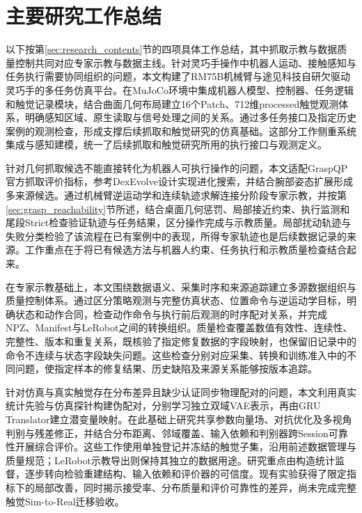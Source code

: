 \section{主要研究工作总结}
\label{sec:ch07_research_work_summary}

以下按第\ref{sec:research_contents}节的四项具体工作总结，其中抓取示教与数据质量控制共同对应专家示教与数据主线。针对灵巧手操作中机器人运动、接触感知与任务执行需要协同组织的问题，本文构建了RM75B机械臂与途见科技自研欠驱动灵巧手的多任务仿真平台。在MuJoCo环境中集成机器人模型、控制器、任务逻辑和触觉记录模块，结合曲面几何布局建立16个Patch、712维processed触觉观测体系，明确感知区域、原生读取与信号处理之间的关系。通过多任务接口及指定历史案例的观测检查，形成支撑后续抓取和触觉研究的仿真基础。这部分工作侧重系统集成与感知建模，统一了后续抓取和触觉研究所用的执行接口与观测定义。

针对几何抓取候选不能直接转化为机器人可执行操作的问题，本文适配GraspQP官方抓取评价指标，参考DexEvolve设计实现进化搜索，并结合腕部姿态扩展形成多来源候选。通过机械臂逆运动学和连续轨迹求解连接分阶段专家示教，并按第\ref{sec:grasp_reachability}节所述，结合桌面几何惩罚、局部接近约束、执行监测和尾段Strict检查验证轨迹与任务结果，区分操作完成与示教质量。局部扰动轨迹与失败分类检验了该流程在已有案例中的表现，所得专家轨迹也是后续数据记录的来源。工作重点在于将已有候选方法与机器人约束、任务执行和示教质量检查结合起来。

在专家示教基础上，本文围绕数据语义、采集时序和来源追踪建立多源数据组织与质量控制体系。通过区分策略观测与完整仿真状态、位置命令与逆运动学目标，明确状态和动作合同，检查动作命令与执行前后观测的时序配对关系，并完成NPZ、Manifest与LeRobot之间的转换组织。质量检查覆盖数值有效性、连续性、完整性、版本和重复关系，既核验了指定修复数据的字段映射，也保留旧记录中的命令不连续与状态字段缺失问题。这些检查分别对应采集、转换和训练准入中的不同问题，使指定样本的修复结果、历史缺陷及来源关系能够按版本追踪。

针对仿真与真实触觉存在分布差异且缺少认证同步物理配对的问题，本文利用真实统计先验与仿真探针构建伪配对，分别学习独立双域VAE表示，再由GRU Translator建立潜变量映射。在此基础上研究共享参数向量场、对抗优化及多视角判别与残差修正，并结合分布距离、邻域覆盖、输入依赖和判别器跨Session可靠性开展综合评价。这些工作使用单独登记并冻结的触觉子集，沿用前述数据管理与质量规范；LeRobot示教导出则保持其独立的数据用途。研究重点由构造统计监督，逐步转向检验重建结构、输入依赖和评价器的可信度。现有实验获得了限定指标下的局部改善，同时揭示接受率、分布质量和评价可靠性的差异，尚未完成完整触觉Sim-to-Real迁移验收。
